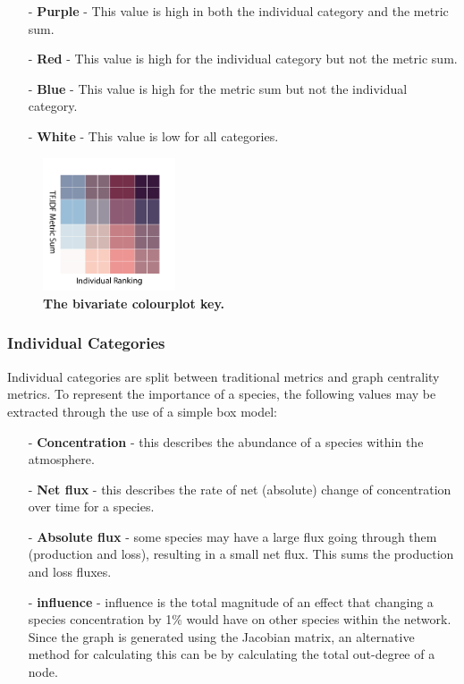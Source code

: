 \begin{itemize}
\item[-] \textbf{Purple} - This value is high in both the individual category and the metric sum.
\item[-] \textbf{Red} - This value is high for the individual category but not the metric sum.
\item[-] \textbf{Blue} - This value is high for the metric sum but not the individual category.
\item[-] \textbf{White} - This value is low for all categories.
\end{itemize}



\begin{figure}[H]
     \centering
         \includegraphics[width=0.35\textwidth,angle=45]{figures_c3/mlpregressor/cbar.pdf}
        \caption{ \textbf{The bivariate colourplot key.} }
        \label{fig:cmap}
\end{figure}


\subsubsection{Individual Categories}
Individual categories are split between traditional metrics and graph centrality metrics. To represent the importance of a species, the following values may be extracted through the use of a simple box model:

\begin{itemize}
\item[-] \textbf{Concentration} - this describes the abundance of a species within the atmosphere.
\item[-] \textbf{Net flux} - this describes the rate of net (absolute) change of concentration over time for a species.
\item[-] \textbf{Absolute flux} - some species may have a large flux going through them (production and loss), resulting in a small net flux. This sums the production and loss fluxes.
\item[-] \textbf{ influence} - influence is the total magnitude of an effect that changing a species concentration by 1\% would have on other species within the network. Since the graph is generated using the Jacobian matrix, an alternative method for calculating this can be by calculating the total out-degree of a node.
\end{itemize}



